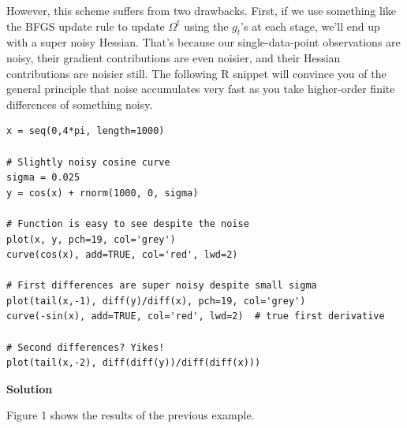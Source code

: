 \documentclass[11 pt]{article}
\begin{document}
However, this scheme suffers from two drawbacks.  First, if we use something like the BFGS update rule to update $\Omega^t$ using the $g_t$'s at each stage, we'll end up with a super noisy Hessian.  That's because our single-data-point observations are noisy, their gradient contributions are even noisier, and their Hessian contributions are noisier still.  The following R snippet will convince you of the general principle that noise accumulates very fast as you take higher-order finite differences of something noisy.

\newpage
\begin{verbatim}
x = seq(0,4*pi, length=1000)

# Slightly noisy cosine curve
sigma = 0.025
y = cos(x) + rnorm(1000, 0, sigma)

# Function is easy to see despite the noise
plot(x, y, pch=19, col='grey')
curve(cos(x), add=TRUE, col='red', lwd=2)

# First differences are super noisy despite small sigma
plot(tail(x,-1), diff(y)/diff(x), pch=19, col='grey')
curve(-sin(x), add=TRUE, col='red', lwd=2)  # true first derivative

# Second differences? Yikes!
plot(tail(x,-2), diff(diff(y))/diff(diff(x)))
\end{verbatim}

\vspace{2mm}
\textbf{Solution}

\vspace{2mm}
Figure 1 shows the results of the previous example.
\end{document}
